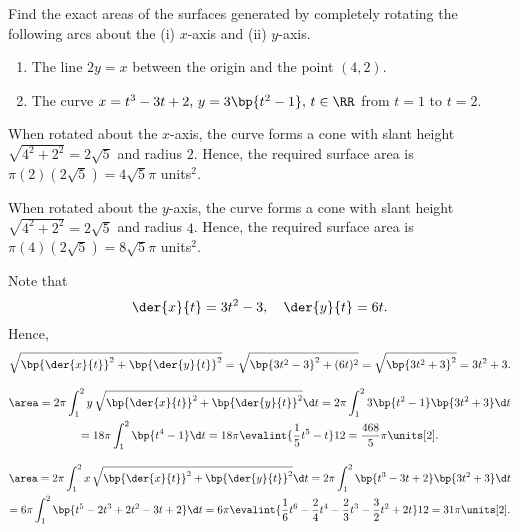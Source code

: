 \begin{problem}
    Find the exact areas of the surfaces generated by completely rotating the following arcs about the (i) $x$-axis and (ii) $y$-axis.

    \begin{enumerate}
        \item The line $2y = x$ between the origin and the point $(4, 2)$.
        \item The curve $x = t^3 - 3t + 2, \, y = 3\bp{t^2 - 1}, \, t \in \RR$ from $t = 1$ to $t = 2$.
    \end{enumerate}
\end{problem}
\begin{solution}
    \begin{ppart}
        \begin{psubpart}
            When rotated about the $x$-axis, the curve forms a cone with slant height $\sqrt{4^2 + 2^2} = 2\sqrt5$ and radius $2$. Hence, the required surface area is $\pi(2)(2\sqrt5) = 4\sqrt5 \pi$ units$^2$.
        \end{psubpart}
        \begin{psubpart}
            When rotated about the $y$-axis, the curve forms a cone with slant height $\sqrt{4^2 + 2^2} = 2\sqrt5$ and radius $4$. Hence, the required surface area is $\pi(4)(2\sqrt5) = 8\sqrt5 \pi$ units$^2$.
        \end{psubpart}
    \end{ppart}
    \begin{ppart}
        Note that \[\der{x}{t} = 3t^2 - 3, \quad \der{y}{t} = 6t.\] Hence, \[\sqrt{\bp{\der{x}{t}}^2 + \bp{\der{y}{t}}^2} = \sqrt{\bp{3t^2 - 3}^2 + (6t)^2} = \sqrt{\bp{3t^2 + 3}^2} = 3t^2 + 3.\]

        \begin{psubpart}
            \begin{gather*}
                \area = 2\pi \int_1^2 y \, \sqrt{\bp{\der{x}{t}}^2 + \bp{\der{y}{t}}^2} \d t = 2\pi \int_1^2 3\bp{t^2 - 1} \bp{3t^2 + 3} \d t \\
                = 18\pi \int_1^2 \bp{t^4 - 1} \d t = 18\pi \evalint{\frac15 t^5 - t}12 = \frac{468}5 \pi \units[2].
            \end{gather*}
        \end{psubpart}
        \begin{psubpart}
            \begin{gather*}
                \area = 2\pi \int_1^2 x \, \sqrt{\bp{\der{x}{t}}^2 + \bp{\der{y}{t}}^2} \d t = 2\pi \int_1^2 \bp{t^3 - 3t + 2} \bp{3t^2 + 3} \d t \\
                = 6\pi \int_1^2 \bp{t^5 - 2t^3 + 2t^2 - 3t + 2} \d t = 6\pi \evalint{\frac16 t^6 - \frac24 t^4 - \frac23 t^3 - \frac32 t^2 + 2t}12 = 31 \pi \units[2].
            \end{gather*}
        \end{psubpart}
    \end{ppart}
\end{solution}

